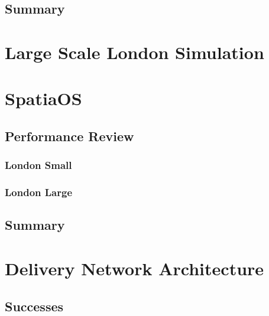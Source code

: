 \documentclass[a4paper,11pt,titlepage]{report}
\begin{document}
\subsection{Summary}



\section{Large Scale London Simulation}

\section{SpatiaOS}
\subsection{Performance Review}
\subsubsection{London Small}
\subsubsection{London Large}

\subsection{Summary}

\section{Delivery Network Architecture}
\subsection{Successes}
\end{document}
